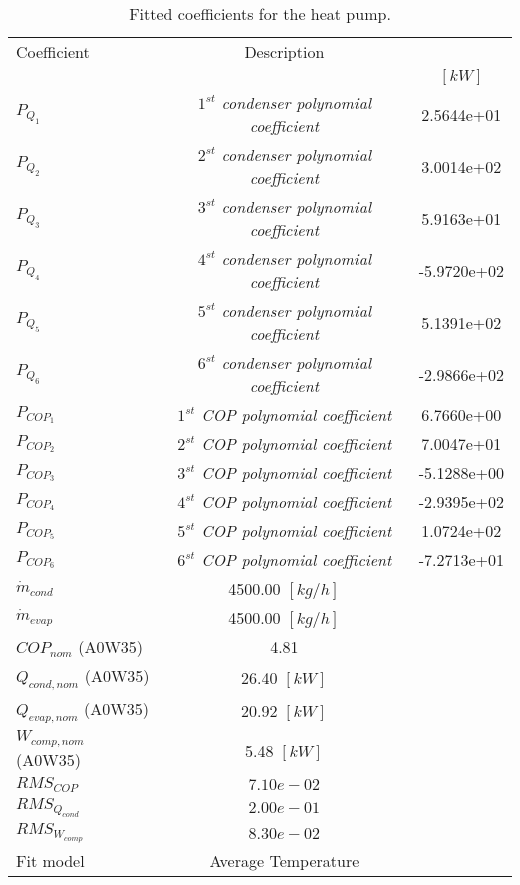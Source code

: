 \documentclass[english]{SPFShortReport}
\author{Dani Carbonell}
\begin{document}
\begin{table}[!ht]
\begin{small}
\caption{Fitted coefficients for the heat pump.}
\begin{center}
\resizebox{12cm}{!} 
{
\begin{tabular}{l | c c } 
\hline
\hline
Coefficient &Description & \\ 
 & &$[kW]$\\ 
\hline
$P_{Q_{1}}$ & \emph{$1^{st}$ condenser polynomial coefficient}  & 2.5644e+01    \\ 
$P_{Q_{2}}$ & \emph{$2^{st}$ condenser polynomial coefficient}  & 3.0014e+02    \\ 
$P_{Q_{3}}$ & \emph{$3^{st}$ condenser polynomial coefficient}  & 5.9163e+01    \\ 
$P_{Q_{4}}$ & \emph{$4^{st}$ condenser polynomial coefficient}  & -5.9720e+02    \\ 
$P_{Q_{5}}$ & \emph{$5^{st}$ condenser polynomial coefficient}  & 5.1391e+02    \\ 
$P_{Q_{6}}$ & \emph{$6^{st}$ condenser polynomial coefficient}  & -2.9866e+02    \\ 
\hline
$P_{COP_{1}}$ & \emph{$1^{st}$ COP polynomial coefficient}  & 6.7660e+00    \\ 
$P_{COP_{2}}$ & \emph{$2^{st}$ COP polynomial coefficient}  & 7.0047e+01    \\ 
$P_{COP_{3}}$ & \emph{$3^{st}$ COP polynomial coefficient}  & -5.1288e+00    \\ 
$P_{COP_{4}}$ & \emph{$4^{st}$ COP polynomial coefficient}  & -2.9395e+02    \\ 
$P_{COP_{5}}$ & \emph{$5^{st}$ COP polynomial coefficient}  & 1.0724e+02    \\ 
$P_{COP_{6}}$ & \emph{$6^{st}$ COP polynomial coefficient}  & -7.2713e+01    \\ 
\hline
$\dot m_{cond}$ & 4500.00 $[kg/h]$ \\ 
$\dot m_{evap}$ & 4500.00 $[kg/h]$ \\ 
\hline
$COP_{nom}$ (A0W35)& 4.81 \\ 
$Q_{cond,nom}$ (A0W35)& 26.40 $[kW]$\\ 
$Q_{evap,nom}$ (A0W35)& 20.92 $[kW]$\\ 
$W_{comp,nom}$ (A0W35)& 5.48 $[kW]$\\ 
\hline
 $RMS_{COP}$ & $7.10e-02$ \\ 
 $RMS_{Q_{cond}}$ & $2.00e-01$ \\ 
 $RMS_{W_{comp}}$ & $8.30e-02$ \\ 
\hline
Fit model & Average Temperature\\ 
\hline
\hline
\end{tabular}
}
\label{CoefTable}
\end{center}
\end{small}
\end{table}
\end{document}
